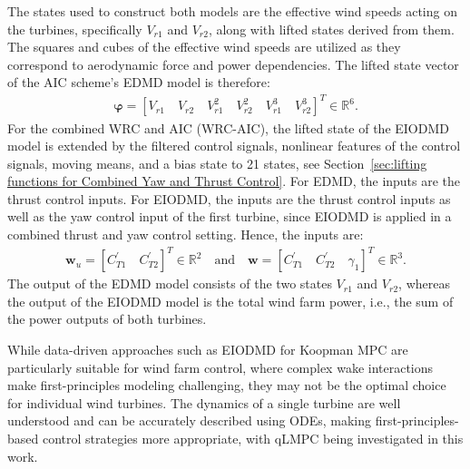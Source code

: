 %
The states used to construct both models are the effective wind speeds acting on the turbines, specifically \( V_{r1} \) and \( V_{r2} \), along with lifted states derived from them. The squares and cubes of the effective wind speeds are utilized as they correspond to aerodynamic force and power dependencies.  The lifted state vector of the AIC scheme's EDMD model is therefore:
\begin{align*}
    \bm{\varphi} = [V_{r1} \quad V_{r2} \quad V^2_{r1} \quad V^2_{r2} \quad  V^3_{r1} \quad V^3_{r2}]^T \in \mathbb{R}^6.
\end{align*}
For the combined WRC and AIC (WRC-AIC), the lifted state of the EIODMD model is extended by the filtered control signals, nonlinear features of the control signals, moving means, and a bias state to 21 states, see Section~\ref{sec:lifting functions for Combined Yaw and Thrust Control}.
%
For EDMD, the inputs are the thrust control inputs. For EIODMD, the inputs are the thrust control inputs as well as the yaw control input of the first turbine, since EIODMD is applied in a combined thrust and yaw control setting. Hence, the inputs are:
\begin{align*}
    \bm{w}_{u} = [C^{\prime}_{T1} \quad C^{\prime}_{T2}]^T \in \mathbb{R}^2 \quad\text{and} \quad
    \bm{w} = [C^{\prime}_{T1} \quad C^{\prime}_{T2} \quad \gamma_1]^T \in \mathbb{R}^3.
\end{align*}
The output of the EDMD model consists of the two states \( V_{r1} \) and \( V_{r2} \), whereas the output of the EIODMD model is the total wind farm power, i.e., the sum of the power outputs of both turbines.

While data-driven approaches such as EIODMD for Koopman MPC are particularly 
suitable for wind farm control, where complex wake interactions make first-principles 
modeling challenging, they may not be the optimal choice for individual wind turbines. 
The dynamics of a single turbine are well understood and can be accurately described 
using ODEs, making first-principles-based control strategies more appropriate, with qLMPC being investigated in this work. 


